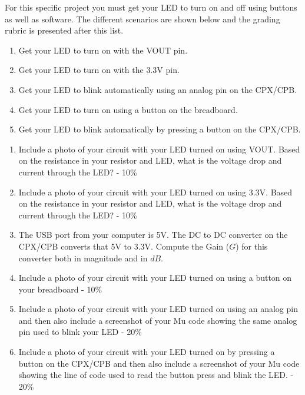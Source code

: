 For this specific project you must get your LED to turn on and off using buttons as well as software. The different scenarios are shown below and the grading rubric is presented after this list.

\begin{enumerate}[itemsep=-5pt]
\item Get your LED to turn on with the VOUT pin.
\item Get your LED to turn on with the 3.3V pin.
\item Get your LED to blink automatically using an analog pin on the CPX/CPB.
\item Get your LED to turn on using a button on the breadboard.
\item Get your LED to blink automatically by pressing a button on the CPX/CPB.
\end{enumerate}



\begin{enumerate}[itemsep=-5pt]
\item Include a photo of your circuit with your LED turned on using VOUT. Based on the resistance in your resistor and LED, what is the voltage drop and current through the LED? - 10\%
\item Include a photo of your circuit with your LED turned on using 3.3V. Based on the resistance in your resistor and LED, what is the voltage drop and current through the LED?  - 10\%
\item The USB port from your computer is 5V. The DC to DC converter on the CPX/CPB converts that 5V to 3.3V. Compute the Gain ($G$) for this converter both in magnitude and in $dB$. 
\item Include a photo of your circuit with your LED turned on using a button on your breadboard - 10\%
\item Include a photo of your circuit with your LED turned on using an analog pin and then also include a screenshot of your Mu code showing the same analog pin used to blink your LED - 20\%
\item Include a photo of your circuit with your LED turned on by pressing a button on the CPX/CPB and then also include a screenshot of your Mu code showing the line of code used to read the button press and blink the LED. - 20\%
\end{enumerate}
